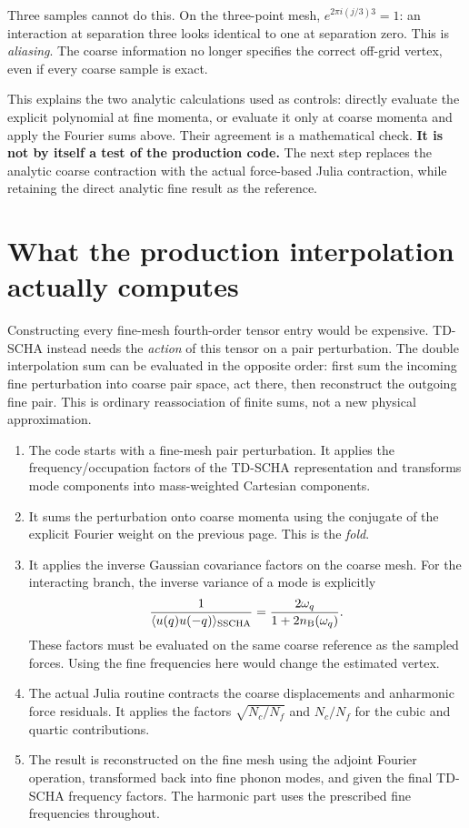 \documentclass[11pt,a4paper]{article}
\newcommand{\pageheading}[1]{\clearpage\section{#1}}
\begin{document}
Three samples cannot do this. On the three-point mesh,
$e^{2\pi i(j/3)3}=1$: an interaction at separation three looks identical to one
at separation zero. This is \emph{aliasing}. The coarse information no longer
specifies the correct off-grid vertex, even if every coarse sample is exact.

This explains the two analytic calculations used as controls: directly evaluate
the explicit polynomial at fine momenta, or evaluate it only at coarse momenta
and apply the Fourier sums above. Their agreement is a mathematical check.
\textbf{It is not by itself a test of the production code.} The next step
replaces the analytic coarse contraction with the actual force-based Julia
contraction, while retaining the direct analytic fine result as the reference.

\pageheading{What the production interpolation actually computes}
Constructing every fine-mesh fourth-order tensor entry would be expensive.
TD-SCHA instead needs the \emph{action} of this tensor on a pair perturbation.
The double interpolation sum can be evaluated in the opposite order: first
sum the incoming fine perturbation into coarse pair space, act there, then
reconstruct the outgoing fine pair. This is ordinary reassociation of finite
sums, not a new physical approximation.

\begin{enumerate}
\item The code starts with a fine-mesh pair perturbation. It applies the
frequency/occupation factors of the TD-SCHA representation and transforms
mode components into mass-weighted Cartesian components.
\item It sums the perturbation onto coarse momenta using the conjugate of the
explicit Fourier weight on the previous page. This is the \emph{fold}.
\item It applies the inverse Gaussian covariance factors on the coarse mesh.
For the interacting branch, the inverse variance of a mode is explicitly
\begin{equation}
 \frac{1}{\langle u(q)u(-q)\rangle_{\rm SSCHA}}
       =\frac{2\omega_q}{1+2n_{\rm B}(\omega_q)}.
\end{equation}
These factors must be evaluated on the same coarse reference as the sampled
forces. Using the fine frequencies here would change the estimated vertex.
\item The actual Julia routine contracts the coarse displacements and
anharmonic force residuals. It applies the factors $\sqrt{N_c/N_f}$ and
$N_c/N_f$ for the cubic and quartic contributions.
\item The result is reconstructed on the fine mesh using the adjoint Fourier
operation, transformed back into fine phonon modes, and given the final
TD-SCHA frequency factors. The harmonic part uses the prescribed fine
frequencies throughout.
\end{enumerate}
\end{document}
